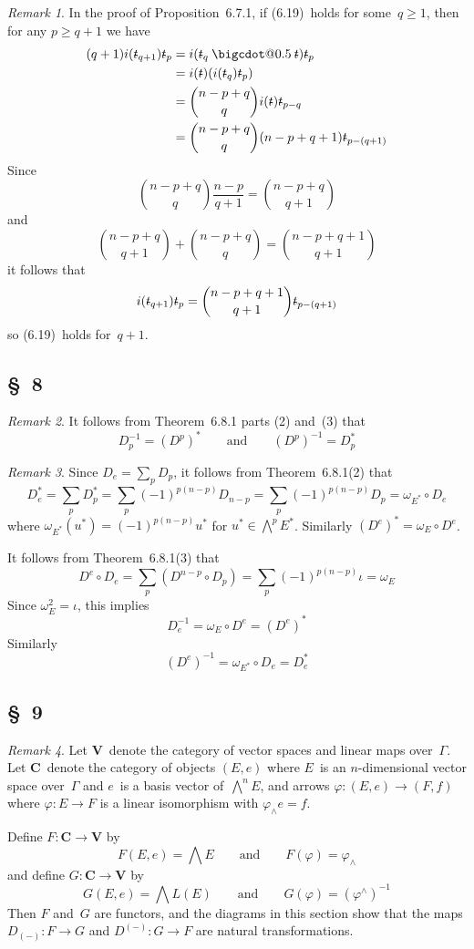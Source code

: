 \documentclass[letterpaper,12pt]{article}
\makeatletter
\newcommand{\bigcdot}[1]{\mathbin{\mathpalette\bigcdot@{#1}}}
\newcommand{\bigcdot@}[2]{%
  \sbox0{$#1\vcenter{}$}%
  \sbox2{$#1\cdot\m@th$}%
  \hbox{%
    \hfil
    \raise\ht0\hbox{%
      \scalebox{#2}{%
        \lower\ht0\hbox{$#1\bullet\m@th$}%
      }%
    }%
    \hfil
  }%
}
\newcommand{\after}{\circ}
\newcommand{\eprod}{\wedge}
\newcommand{\bigeprod}{\bigwedge}
\newcommand{\medeprod}{{\textstyle\bigeprod}}
\newcommand{\mprod}{\bigcdot{0.5}}
\newcommand{\cat}[1]{\mathbf{#1}}
\newcommand{\stroked}[1]{\mathrlap{\text{\kern0.05em-}}#1}
\newcommand{\unit}{\stroked{t}}
\theoremstyle{definition}
\theoremstyle{remark}
\newtheorem*{rmk}{Remark}
\makeatother
\begin{document}
\begin{rmk}
In the proof of Proposition~6.7.1, if (6.19)~holds for some~\(q\ge 1\), then for any \(p\ge q+1\) we have
\begin{align*}
(q+1)i(\unit_{q+1})\unit_p&=i(\unit_q\mprod\unit)\unit_p\\
	&=i(\unit)(i(\unit_q)\unit_p)\\
	&=\binom{n-p+q}{q}i(\unit)\unit_{p-q}\\
	&=\binom{n-p+q}{q}(n-p+q+1)\unit_{p-(q+1)}
\end{align*}
Since
\[\binom{n-p+q}{q}\frac{n-p}{q+1}=\binom{n-p+q}{q+1}\]
and
\[\binom{n-p+q}{q+1}+\binom{n-p+q}{q}=\binom{n-p+q+1}{q+1}\]
it follows that
\[i(\unit_{q+1})\unit_p=\binom{n-p+q+1}{q+1}\unit_{p-(q+1)}\]
so (6.19)~holds for~\(q+1\).
\end{rmk}

\subsection*{\S~8}
\begin{rmk}
It follows from Theorem~6.8.1 parts (2) and~(3) that
\[D_p^{-1}=(D^p)^*\qquad\text{and}\qquad(D^p)^{-1}=D_p^*\]
\end{rmk}

\begin{rmk}
Since \(D_e=\sum_p D_p\), it follows from Theorem~6.8.1(2) that
\[D_e^*=\sum_p D_p^*=\sum_p(-1)^{p(n-p)}D_{n-p}=\sum_p(-1)^{p(n-p)}D_p=\omega_{E^*}\after D_e\]
where \(\omega_{E^*}(u^*)=(-1)^{p(n-p)}u^*\) for \(u^*\in\medeprod^p E^*\). Similarly \((D^e)^*=\omega_E\after D^e\).

It follows from Theorem~6.8.1(3) that
\[D^e\after D_e=\sum_p(D^{n-p}\after D_p)=\sum_p(-1)^{p(n-p)}\iota=\omega_E\]
Since \(\omega_E^2=\iota\), this implies
\[D_e^{-1}=\omega_E\after D^e=(D^e)^*\]
Similarly
\[(D^e)^{-1}=\omega_{E^*}\after D_e=D_e^*\]
\end{rmk}

\subsection*{\S~9}
\begin{rmk}
Let \(\cat{V}\)~denote the category of vector spaces and linear maps over~\(\Gamma\). Let \(\cat{C}\)~denote the category of objects \((E,e)\) where \(E\)~is an \(n\)-dimensional vector space over~\(\Gamma\) and \(e\)~is a basis vector of~\(\medeprod^n E\), and arrows \(\varphi:(E,e)\to(F,f)\) where \(\varphi:E\to F\) is a linear isomorphism with \(\varphi_{\eprod}e=f\).

Define \(F:\cat{C}\to\cat{V}\) by
\[F(E,e)=\medeprod E\qquad\text{and}\qquad F(\varphi)=\varphi_{\eprod}\]
and define \(G:\cat{C}\to\cat{V}\) by
\[G(E,e)=\medeprod L(E)\qquad\text{and}\qquad G(\varphi)=(\varphi^{\eprod})^{-1}\]
Then \(F\) and~\(G\) are functors, and the diagrams in this section show that the maps \(D_{(-)}:F\to G\) and \(D^{(-)}:G\to F\) are natural transformations.
\end{rmk}
\end{document}
